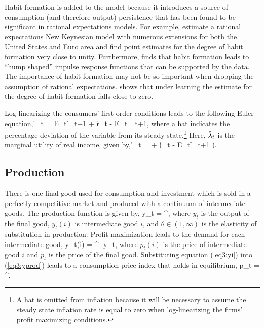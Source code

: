 Habit formation is added to the model because it introduces a source of consumption (and therefore output) persistence that has been found to be significant in rational expectations models.  For example,  estimate a rational expectations New Keynesian model with numerous extensions for both the United States and Euro area and find point estimates for the degree of habit formation very close to unity.  Furthermore,  finds that habit formation leads to ``hump shaped'' impulse response functions that can be supported by the data.  The importance of habit formation may not be so important when dropping the assumption of rational expectations.   shows that under learning the estimate for the degree of habit formation falls close to zero.

Log-linearizing the consumers' first order conditions leads to the following Euler equation,
\beq \label{eq3:lneuler} \h{\lambda}_{t} = E_t \h{\lambda}_{t+1} + \h{r}_t - E_t \pi_{t+1}, \eeq
where a hat indicates the percentage deviation of the variable from its steady state.\footnote{A hat is omitted from inflation because it will be necessary to assume the steady state inflation rate is equal to zero when log-linearizing the firms' profit maximizing conditions.}  Here, $\hat{\lambda}_t$ is the marginal utility of real income, given by,
\beq \label{eq3:lnlambda} \h{\lambda}_t =  + \left(\h{\xi}_t - \beta \eta E_t \h{\xi}_{t+1} \right). \eeq

\subsection{Production}
There is one final good used for consumption and investment which is sold in a perfectly competitive market and produced with a continuum of intermediate goods.  The production function is given by,
\beq \label{eq3:yprod} y_t = ^{}, \eeq
where $y_t$ is the output of the final good, $y_t(i)$ is intermediate good $i$, and $\theta \in (1,\infty)$ is the elasticity of substitution in production.  Profit maximization leads to the demand for each intermediate good,
\beq \label{eq3:yi} y_t(i) = ^{-\theta} y_t, \eeq
where $p_t(i)$ is the price of intermediate good $i$ and $p_t$ is the price of the final good.  Substituting equation (\ref{eq3:yi}) into (\ref{eq3:yprod}) leads to a consumption price index that holds in equilibrium,
\beq \label{eq3:pfinal} p_t = ^{}. \eeq


